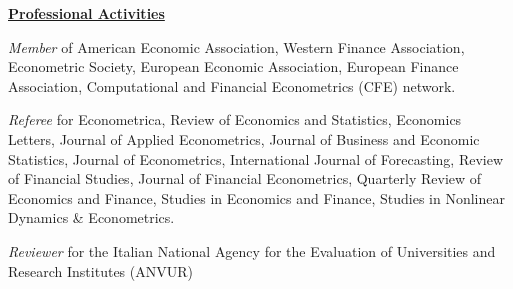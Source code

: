 \documentclass[12pt]{article}
\begin{document}
\underline{\textbf{Professional Activities}}
\begin{description}
\item\emph{Member} of American Economic Association, Western Finance Association, Econometric Society, European Economic Association, European Finance Association, Computational and Financial Econometrics (CFE) network.

\item \emph{Referee} for Econometrica, Review of Economics and Statistics, Economics Letters, Journal of Applied Econometrics, Journal of Business and Economic Statistics, Journal of Econometrics, International Journal of Forecasting, Review of Financial Studies, Journal of Financial Econometrics, Quarterly Review of Economics and Finance, Studies in Economics and Finance, Studies in Nonlinear Dynamics & Econometrics.

\item \emph{Reviewer} for the Italian National Agency for the Evaluation of Universities and Research Institutes (ANVUR) 
\end{description}
 
\end{document}
